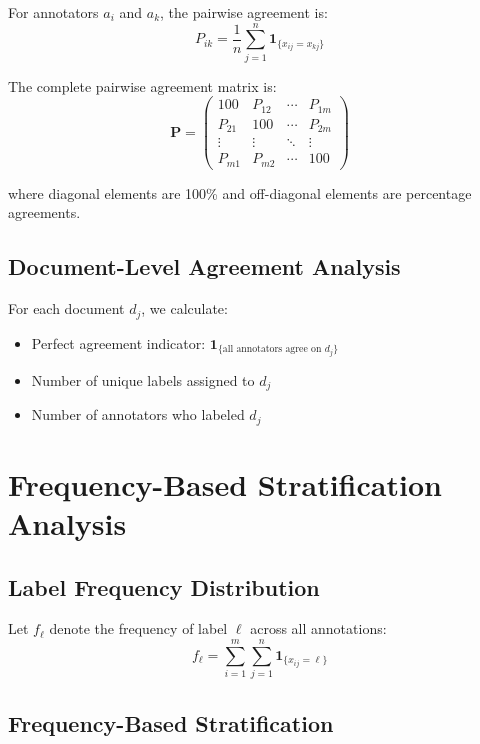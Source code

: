 \documentclass[11pt]{article}
\begin{document}
For annotators $a_i$ and $a_k$, the pairwise agreement is:
\begin{equation}
P_{ik} = \frac{1}{n} \sum_{j=1}^{n} \mathbf{1}_{\{x_{ij} = x_{kj}\}}
\end{equation}

The complete pairwise agreement matrix is:
\begin{equation}
\mathbf{P} = \begin{pmatrix}
100 & P_{12} & \cdots & P_{1m} \\
P_{21} & 100 & \cdots & P_{2m} \\
\vdots & \vdots & \ddots & \vdots \\
P_{m1} & P_{m2} & \cdots & 100
\end{pmatrix}
\end{equation}

where diagonal elements are 100\% and off-diagonal elements are percentage agreements.

\subsection{Document-Level Agreement Analysis}

For each document $d_j$, we calculate:
\begin{itemize}
\item Perfect agreement indicator: $\mathbf{1}_{\{\text{all annotators agree on } d_j\}}$
\item Number of unique labels assigned to $d_j$
\item Number of annotators who labeled $d_j$
\end{itemize}

\section{Frequency-Based Stratification Analysis}

\subsection{Label Frequency Distribution}

Let $f_\ell$ denote the frequency of label $\ell$ across all annotations:
\begin{equation}
f_\ell = \sum_{i=1}^{m} \sum_{j=1}^{n} \mathbf{1}_{\{x_{ij} = \ell\}}
\end{equation}

\subsection{Frequency-Based Stratification}
\end{document}
